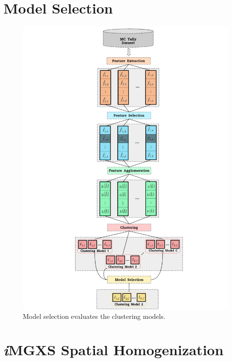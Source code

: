 \section{Model Selection}
\label{sec:chap10-model-select}

\begin{figure}[h!]
\centering
\includegraphics[width=0.95\linewidth]{figures/unsupervised/features/engineering/model}
\vspace{2mm}
\caption[\textit{i}MGXS model selection]{Model selection evaluates the clustering models.}
\label{fig:chap10-model}
\end{figure}


\section{\textit{i}\ac{MGXS} Spatial Homogenization}
\label{sec:chap10-imgxs-pipeline}

